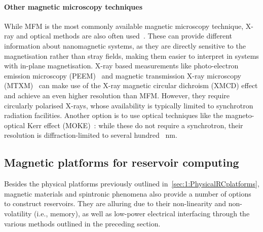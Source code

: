 \paragraph{Other magnetic microscopy techniques}
While MFM is the most commonly available magnetic microscopy technique, X-ray and optical methods are also often used~\cite{DynamicEmergence_NanomagneticSystem}.
These can provide different information about nanomagnetic systems, as they are directly sensitive to the magnetisation rather than stray fields, making them easier to interpret in systems with in-plane magnetisation.
X-ray based measurements like photo-electron emission microscopy (PEEM)~\cite{PEEM} and magnetic transmission X-ray microscopy (MTXM)~\cite{Imaging_MTXM} can make use of the X-ray magnetic circular dichroism (XMCD) effect and achieve an even higher resolution than MFM.
However, they require circularly polarised X-rays, whose availability is typically limited to synchrotron radiation facilities.
Another option is to use optical techniques like the magneto-optical Kerr effect (MOKE)~\cite{KerrFaraday_book}: while these do not require a synchrotron, their resolution is diffraction-limited to several hundred \SI{}{\nano\metre}.

\subsection{Magnetic platforms for reservoir computing}\label{sec:1_RC_magnetic}
Besides the physical platforms previously outlined in~\cref{sec:1:PhysicalRCplatforms}, magnetic materials and spintronic phenomena also provide a number of options to construct reservoirs.
They are alluring due to their non-linearity and non-volatility (i.e., memory), as well as low-power electrical interfacing through the various methods outlined in the preceding section.

